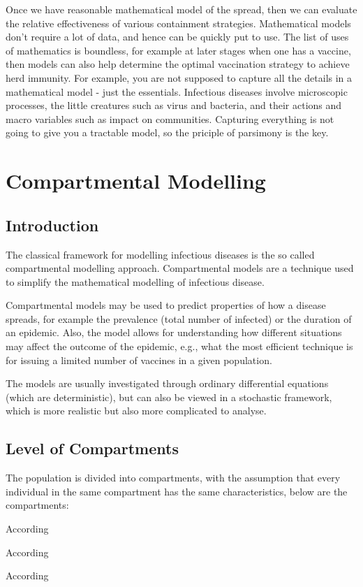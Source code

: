 \documentclass[fontsize=17pt]{article}
\begin{document}
Once we have reasonable mathematical model of the spread, then we can evaluate the relative effectiveness of various containment strategies. Mathematical models don't require a lot of data, and hence can be quickly put to use. The list of uses of mathematics is boundless, for example at later stages when one has a vaccine, then models can also help determine the optimal vaccination strategy to achieve herd immunity. For example, you are not supposed to capture all the details in a mathematical model - just the essentials. Infectious diseases involve microscopic processes, the little creatures such as virus and bacteria, and their actions and macro variables such as impact on communities. Capturing everything is not going to give you a tractable model, so the priciple of parsimony is the key.

\section{Compartmental Modelling}
\subsection{Introduction}
The classical framework for modelling infectious diseases is the so called compartmental modelling approach. Compartmental models are a technique used to simplify the mathematical modelling of infectious disease. 

Compartmental models may be used to predict properties of how a disease spreads, for example the prevalence (total number of infected) or the duration of an epidemic. Also, the model allows for understanding how different situations may affect the outcome of the epidemic, e.g., what the most efficient technique is for issuing a limited number of vaccines in a given population. 

The models are usually investigated through ordinary differential equations (which are deterministic), but can also be viewed in a stochastic framework, which is more realistic but also more complicated to analyse.


\subsection{Level of Compartments}
The population is divided into compartments, with the assumption that every individual in the same compartment has the same characteristics, below are the compartments:

\begin{description}[leftmargin=!,labelwidth=\widthof{\bfseries Susceptibles}]
	
	\item[Susceptibles] According 
	\item[Infactives] According 
	\item[Removed] According 
	
\end{description}
\end{document}

